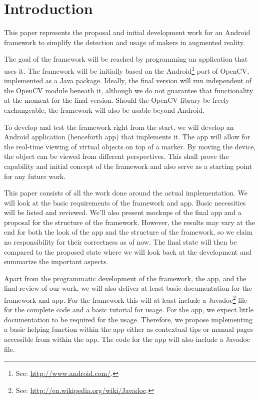 \section{Introduction}

This paper represents the proposal and initial development work for an Android framework to simplify the detection and usage of makers in augmented reality.

The goal of the framework will be reached by programming an application that uses it.
The framework will be initially based on the Android\footnote{See: \url{http://www.android.com/}.} port\cite{opencvandroid} of OpenCV\cite{opencv}, implemented as a Java package.
Ideally, the final version will run independent of the OpenCV module beneath it, although we do not guarantee that functionality at the moment for the final version.
Should the OpenCV library be freely exchangeable, the framework will also be usable beyond Android.

To develop and test the framework right from the start, we will develop an Android application (henceforth app) that implements it.
The app will allow for the real-time viewing of virtual objects on top of a marker.
By moving the device, the object can be viewed from different perspectives.
This shall prove the capability and initial concept of the framework and also serve as a starting point for any future work.

This paper consists of all the work done around the actual implementation.
We will look at the basic requirements of the framework and app.
Basic necessities will be listed and reviewed.
We'll also present mockups of the final app and a proposal for the structure of the framework.
However, the results may vary at the end for both the look of the app and the structure of the framework, so we claim no responsibility for their correctness as of now.
The final state will then be compared to the proposed state where we will look back at the development and summarize the important aspects.

Apart from the programmatic development of the framework, the app, and the final review of our work, we will also deliver at least basic documentation for the framework and app.
For the framework this will at least include a Javadoc\footnote{See: \url{http://en.wikipedia.org/wiki/Javadoc}.} file for the complete code and a basic tutorial for usage.
For the app, we expect little documentation to be required for the usage.
Therefore, we propose implementing a basic helping function within the app either as contextual tips or manual pages accessible from within the app.
The code for the app will also include a Javadoc file.

